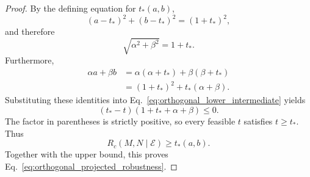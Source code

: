 \documentclass[10pt,a4paper]{amsart}
\begin{document}
\begin{proof}
By the defining equation for $t_*(a,b)$,
\[
(a-t_*)^2+(b-t_*)^2=(1+t_*)^2,
\]
and therefore
\[
\sqrt{\alpha^2+\beta^2}=1+t_*.
\]
Furthermore,
\begin{align*}
\alpha a+\beta b
&=
\alpha(\alpha+t_*)+\beta(\beta+t_*)
\\
&=
(1+t_*)^2+t_*(\alpha+\beta).
\end{align*}
Substituting these identities into Eq.~\eqref{eq:orthogonal_lower_intermediate} yields
\[
(t_*-t)
\left(
1+t_*+\alpha+\beta
\right)
\le0.
\]
The factor in parentheses is strictly positive, so every feasible $t$ satisfies $t\ge t_*$. Thus
\[
R_c(M,N\mid\mathcal E)\ge t_*(a,b).
\]
Together with the upper bound, this proves Eq.~\eqref{eq:orthogonal_projected_robustness}.
\end{proof}
\end{document}
